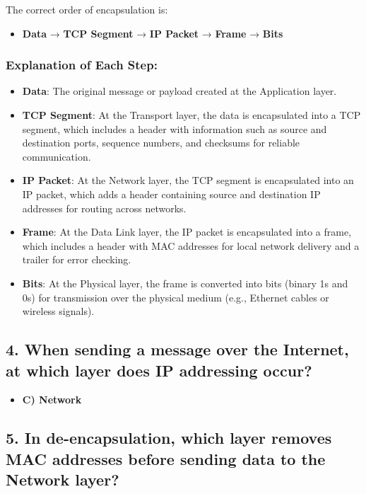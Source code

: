 \documentclass{article}
\begin{document}
The correct order of encapsulation is:
\begin{itemize}
    \item \textbf{Data} → \textbf{TCP Segment} → \textbf{IP Packet} → \textbf{Frame} → \textbf{Bits}
\end{itemize}

\subsubsection*{Explanation of Each Step:}
\begin{itemize}
    \item \textbf{Data}: The original message or payload created at the Application layer.
    \item \textbf{TCP Segment}: At the Transport layer, the data is encapsulated into a TCP segment, which includes a header with information such as source and destination ports, sequence numbers, and checksums for reliable communication.
    \item \textbf{IP Packet}: At the Network layer, the TCP segment is encapsulated into an IP packet, which adds a header containing source and destination IP addresses for routing across networks.
    \item \textbf{Frame}: At the Data Link layer, the IP packet is encapsulated into a frame, which includes a header with MAC addresses for local network delivery and a trailer for error checking.
    \item \textbf{Bits}: At the Physical layer, the frame is converted into bits (binary 1s and 0s) for transmission over the physical medium (e.g., Ethernet cables or wireless signals).
\end{itemize}

\subsection*{4. When sending a message over the Internet, at which layer does IP addressing occur?}

\begin{itemize}
    \item \textbf{C) Network}
\end{itemize}

\subsection*{5. In de-encapsulation, which layer removes MAC addresses before sending data to the Network layer?}
\end{document}
